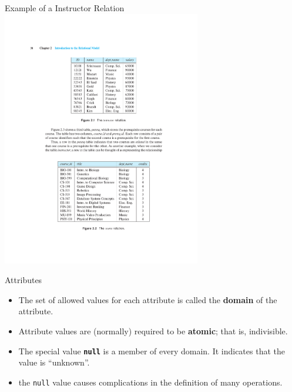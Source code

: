 \documentclass{beamer}
\begin{document}
\begin{frame}{Example of a Instructor Relation}
    \centering
    \vspace{5mm}
    \includegraphics[width=0.65\textwidth, trim={7.25cm 16.75cm 6.5cm 4.75cm}, clip]{figures/Instructor_relation}
\end{frame}

\begin{frame}{Attributes}
    \begin{itemize}
        \item The set of allowed values for each attribute is called the \textbf{domain} of the attribute.
        \item Attribute values are (normally) required to be \textbf{atomic}; that is, indivisible.
        \item The special value \textbf{\texttt{null}} is a member of every domain.  It indicates that the value is ``unknown''.
        \item the \texttt{null} value causes complications in the definition of many operations.
    \end{itemize}
\end{frame}
\end{document}

